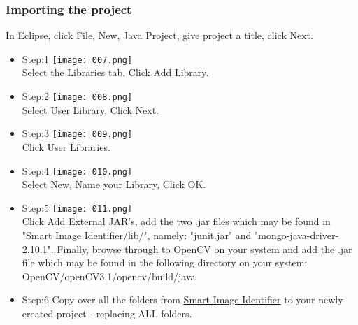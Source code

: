 \documentclass[a4paper,12pt]{report}
\begin{document}
	\subsubsection{Importing the project}
	In Eclipse, click File, New, Java Project, give project a title, click Next. \newline\newline
	
	\begin{itemize}
		\item Step:1	\linebreak
		\texttt{[image: 007.png]}\\
		\linebreak
		Select the Libraries tab, Click Add Library.
		\pagebreak
		\item Step:2	\linebreak
		\texttt{[image: 008.png]}\\ 
		\linebreak 
		Select User Library, Click Next.
		\item Step:3	\linebreak
		\texttt{[image: 009.png]}\\
		\linebreak
		Click User Libraries.
		\pagebreak
		\item Step:4	\linebreak
		\texttt{[image: 010.png]}\\
		\linebreak
		Select New, Name your Library, Click OK.
		\linebreak
		\item Step:5	\linebreak
		\texttt{[image: 011.png]}\\
		\linebreak
		Click Add External JAR's, add the two .jar files which may be found in "Smart Image Identifier/lib/", namely: "junit.jar" and "mongo-java-driver-2.10.1".
		\linebreak\linebreak
		Finally, browse through to OpenCV on your system and add the .jar file which may be found in the following directory on your system: OpenCV/openCV3.1/opencv/build/java		
		\pagebreak
		\item Step:6	\linebreak
		Copy over all the folders from \href{https://github.com/StephenSwanepoel/Ambitious-Designs/tree/master/Smart\%20Image\%20Identifier}{Smart Image Identifier} to your newly created project - replacing ALL folders.
		
		
	\end{itemize}
	
\end{document}
